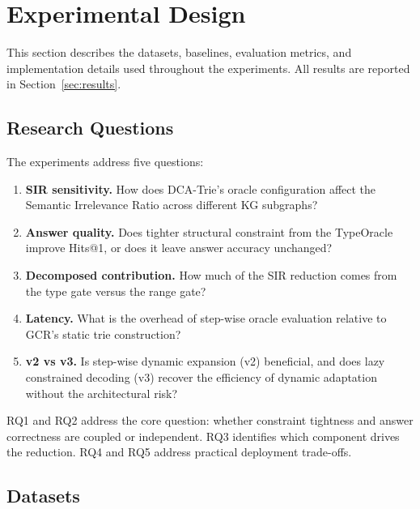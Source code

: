 
\section{Experimental Design}
\label{sec:exp_design}

This section describes the datasets, baselines, evaluation metrics, and implementation
details used throughout the experiments. All results are reported in
Section~\ref{sec:results}.

\subsection{Research Questions}
\label{sec:rq}

The experiments address five questions:

\begin{enumerate}[label=(\textbf{RQ\arabic*)}]
  \item \textbf{SIR sensitivity.} How does DCA-Trie's oracle configuration affect the
        Semantic Irrelevance Ratio across different KG subgraphs?
  \item \textbf{Answer quality.} Does tighter structural constraint from the TypeOracle
        improve Hits@1, or does it leave answer accuracy unchanged?
  \item \textbf{Decomposed contribution.} How much of the SIR reduction comes from the
        type gate versus the range gate?
  \item \textbf{Latency.} What is the overhead of step-wise oracle evaluation relative to
        GCR's static trie construction?
  \item \textbf{v2 vs v3.} Is step-wise dynamic expansion (v2) beneficial, and does lazy
        constrained decoding (v3) recover the efficiency of dynamic adaptation without the
        architectural risk?
\end{enumerate}

RQ1 and RQ2 address the core question: whether constraint tightness and answer
correctness are coupled or independent. RQ3 identifies which component drives the
reduction. RQ4 and RQ5 address practical deployment trade-offs.

\subsection{Datasets}
\label{sec:datasets}


